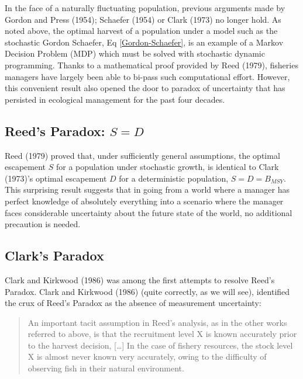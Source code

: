 \documentclass[3p]{elsarticle} %
\begin{document}
In the face of a naturally fluctuating population, previous arguments
made by Gordon and Press (1954); Schaefer (1954) or Clark (1973) no
longer hold. As noted above, the optimal harvest of a population under a
model such as the stochastic Gordon Schaefer, Eq
\eqref{Gordon-Schaefer}, is an example of a Markov Decision Problem
(MDP) which must be solved with stochastic dynamic programming. Thanks
to a mathematical proof provided by Reed (1979), fisheries managers have
largely been able to bi-pass such computational effort. However, this
convenient result also opened the door to paradox of uncertainty that
has persisted in ecological management for the past four decades.

\hypertarget{reeds-paradox-s-d}{%
\subsection{\texorpdfstring{Reed's Paradox:
\(S = D\)}{Reed's Paradox: S = D}}\label{reeds-paradox-s-d}}

Reed (1979) proved that, under sufficiently general assumptions, the
optimal escapement \(S\) for a population under stochastic growth, is
identical to Clark (1973)'s optimal escapement \(D\) for a deterministic
population, \(S = D = B_{MSY}\). This surprising result suggests that in
going from a world where a manager has perfect knowledge of absolutely
everything into a scenario where the manager faces considerable
uncertainty about the future state of the world, no additional
precaution is needed.

\hypertarget{clarks-paradox}{%
\subsection{Clark's Paradox}\label{clarks-paradox}}

Clark and Kirkwood (1986) was among the first attempts to resolve Reed's
Paradox. Clark and Kirkwood (1986) (quite correctly, as we will see),
identified the crux of Reed's Paradox as the absence of measurement
uncertainty:

\begin{quote}
An important tacit assumption in Reed's analysis, as in the other works
referred to above, is that the recruitment level X is known accurately
prior to the harvest decision, {[}\ldots{}{]} In the case of fishery
resources, the stock level X is almost never known very accurately,
owing to the difficulty of observing fish in their natural environment.
\end{quote}
\end{document}
